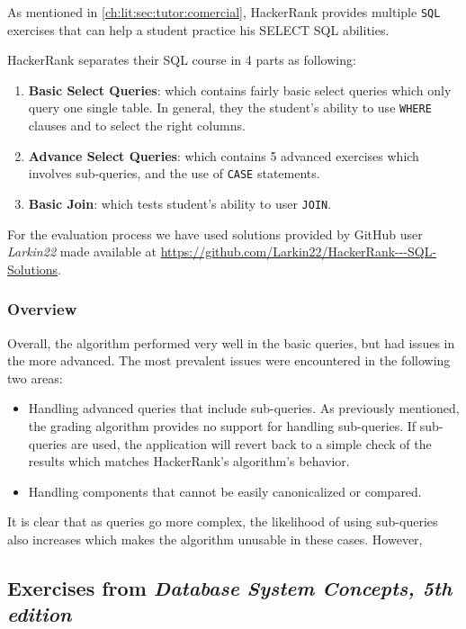 As mentioned in \ref{ch:lit:sec:tutor:comercial}, HackerRank provides multiple \texttt{SQL} exercises that can help a student practice his SELECT SQL abilities.

HackerRank separates their SQL course in 4 parts as following:
\begin{enumerate}
    \item \textbf{Basic Select Queries}: which contains fairly basic select queries which only query one single table. In general, they the student's ability to use \texttt{WHERE} clauses and to select the right columns.
    \item \textbf{Advance Select Queries}: which contains 5 advanced exercises which involves sub-queries, and the use of \texttt{CASE} statements.
    \item \textbf{Basic Join}: which tests student's ability to user \texttt{JOIN}.
\end{enumerate}

For the evaluation process we have used solutions provided by GitHub user \textit{Larkin22} made available at \url{https://github.com/Larkin22/HackerRank---SQL-Solutions}.

\subsubsection{Overview}

Overall, the algorithm performed very well in the basic queries, but had issues in the more advanced. The most prevalent issues were encountered in the following two areas:
\begin{itemize}
    \item Handling advanced queries that include sub-queries. As previously mentioned, the grading algorithm provides no support for handling sub-queries. If sub-queries are used, the application will revert back to a simple check of the results which matches HackerRank's algorithm's behavior.
    \item Handling components that cannot be easily canonicalized or compared.
\end{itemize}

It is clear that as queries go more complex, the likelihood of using sub-queries also increases which makes the algorithm unusable in these cases. However,

\subsection{Exercises from \textit{Database System Concepts, 5th edition}}

